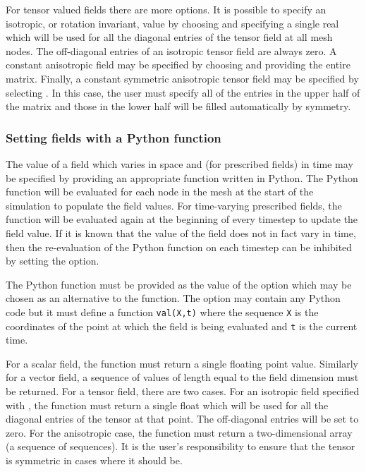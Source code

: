 For tensor valued fields there are more options. It is possible to specify
an isotropic, or rotation invariant, value by choosing
 and specifying a single real which
will be used for all the diagonal entries of the tensor field at all mesh
nodes. The off-diagonal entries of an isotropic tensor field are always
zero. A constant anisotropic field may be specified by choosing
 and providing the
entire matrix. Finally, a constant symmetric anisotropic tensor field may be
specified by selecting \onlypdf\linebreak
{}. In this case, the
user must specify all of the entries in the upper half of the matrix and
those in the lower half will be filled automatically by symmetry.

\subsubsection{Setting fields with a Python function}\label{Sect:setting_with_python}
The value of a field which varies in space and (for prescribed fields) in
time may be specified by providing an appropriate function written in
Python. The Python function will be evaluated for each node in the mesh at
the start of the simulation to populate the field values. For time-varying
prescribed fields, the function will be evaluated again at the beginning of
every timestep to update the field value. If it is known that the value of
the field does not in fact vary in time, then the re-evaluation of the
Python function on each timestep can be inhibited by setting the
\onlypdf\linebreak {} option.

The Python function must be provided as the value of the
 option which may be chosen as an alternative to the
 function. The option may contain any Python code
but it must define a function \lstinline[language=Python]+val(X,t)+ where
the sequence \lstinline[language=Python]+X+ is the coordinates of the point
at which the field is being evaluated and \lstinline[language=Python]+t+ is
the current time. 

For a scalar field, the function must return a single floating point
value. Similarly for a vector field, a sequence of values of length equal to
the field dimension must be returned. For a tensor field, there are two
cases. For an isotropic field specified with
, the function must return a single
float which will be used for all the diagonal entries of the tensor at that
point. The off-diagonal entries will be set to zero. For the anisotropic case,
the function must return a two-dimensional array (a sequence of
sequences). It is the user's responsibility to ensure that the tensor is
symmetric in cases where it should be.

